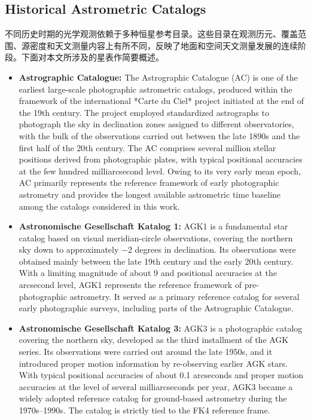 \documentclass{aastex701}
\begin{document}
\subsection{Historical Astrometric Catalogs} \label{subsec:historical}
不同历史时期的光学观测依赖于多种恒星参考目录。这些目录在观测历元、覆盖范围、源密度和天文测量内容上有所不同，反映了地面和空间天文测量发展的连续阶段。下面对本文所涉及的星表作简要概述。

\begin{itemize}
    \item \textbf{Astrographic Catalogue:} \label{subsubsec:ac} The Astrographic Catalogue (AC) is one of the earliest large-scale photographic astrometric catalogs, produced within the framework of the international *Carte du Ciel* project initiated at the end of the 19th century. The project employed standardized astrographs to photograph the sky in declination zones assigned to different observatories, with the bulk of the observations carried out between the late 1890s and the first half of the 20th century. The AC comprises several million stellar positions derived from photographic plates, with typical positional accuracies at the few hundred milliarcsecond level. Owing to its very early mean epoch, AC primarily represents the reference framework of early photographic astrometry and provides the longest available astrometric time baseline among the catalogs considered in this work.

    \item \textbf{Astronomische Gesellschaft Katalog 1:} \label{subsubsec:agk1} AGK1 is a fundamental star catalog based on visual meridian-circle observations, covering the northern sky down to approximately −2 degrees in declination. Its observations were obtained mainly between the late 19th century and the early 20th century. With a limiting magnitude of about 9 and positional accuracies at the arcsecond level, AGK1 represents the reference framework of pre-photographic astrometry. It served as a primary reference catalog for several early photographic surveys, including parts of the Astrographic Catalogue.

    \item \textbf{Astronomische Gesellschaft Katalog 3:} \label{subsubsec:agk3} AGK3 is a photographic catalog covering the northern sky, developed as the third installment of the AGK series. Its observations were carried out around the late 1950s, and it introduced proper motion information by re-observing earlier AGK stars. With typical positional accuracies of about 0.1 arcseconds and proper motion accuracies at the level of several milliarcseconds per year, AGK3 became a widely adopted reference catalog for ground-based astrometry during the 1970s–1990s. The catalog is strictly tied to the FK4 reference frame.


\end{itemize}
\end{document}
